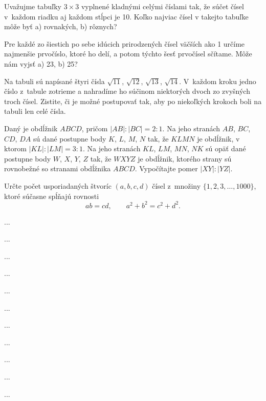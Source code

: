 {%
Uvažujme tabuľky $3\times 3$ vyplnené kladnými celými číslami tak, že súčet čísel v~každom riadku aj každom stĺpci je 10. Koľko najviac čísel v takejto tabuľke môže byť
\ite a) rovnakých,
\ite b) rôznych?
}

{%
Pre každé zo šiestich po sebe idúcich prirodzených čísel väčších ako 1 určíme najmenšie prvočíslo, ktoré ho delí, a potom týchto šesť prvočísel sčítame. Môže nám vyjsť
\ite a) 23,
\ite b) 25?
}

{%
Na tabuli sú napísané štyri čísla $\sqrt{11}$, $\sqrt{12}$, $\sqrt{13}$, $\sqrt{14}$. V~každom kroku jedno číslo z~tabule zotrieme a nahradíme ho súčinom niektorých dvoch zo zvyšných troch čísel. Zistite, či je možné postupovať
tak, aby po niekoľkých krokoch boli na tabuli len celé čísla.}

{%
Daný je obdĺžnik $ABCD$, pričom ${|AB|:|BC|}=2:1$. Na jeho stranách $AB$, $BC$, $CD$, $DA$ sú dané postupne body $K$, $L$, $M$, $N$ tak, že $KLMN$ je obdĺžnik, v ktorom $|KL|:|LM|=3:1$. Na jeho stranách $KL$, $LM$, $MN$, $NK$ sú opäť dané postupne body $W$, $X$, $Y$, $Z$ tak, že $WXYZ$ je obdĺžnik, ktorého strany sú rovnobežné so stranami obdĺžnika $ABCD$. Vypočítajte pomer $|XY|:|YZ|$.}

{%
Určte počet usporiadaných štvoríc $(a,b,c,d)$ čísel z~množiny $\{1,2,3,\dots,1000\}$, ktoré súčasne spĺňajú rovnosti
$$
ab=cd,\qquad a^2+b^2=c^2+d^2.
$$
}

{%
...}

{%
...}

{%
...}

{%
...}

{%
...}

{%
...}

{%
...}

{%
...}

{%
...}

{%
...}

{%
...}

